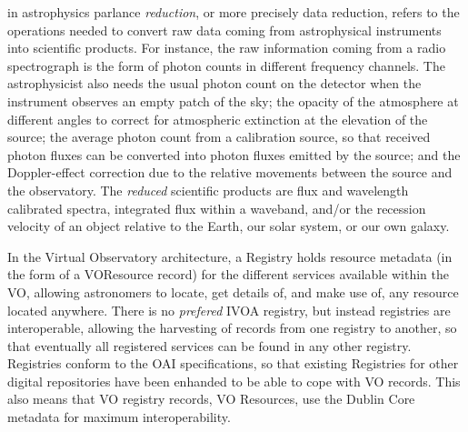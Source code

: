 {
    	in astrophysics parlance \emph{reduction}, or more precisely
        data reduction, refers to the operations needed to convert raw
        data coming from astrophysical instruments into scientific
        products. For instance, the raw information coming from a radio
        spectrograph is the form of photon counts in different
        frequency channels. The astrophysicist also needs the usual
        photon count on the detector when the instrument observes an
        empty patch of the sky; the opacity of the atmosphere at
        different angles to correct for atmospheric extinction at the
        elevation of the source; the average photon count from a
        calibration source, so that received photon fluxes can be
        converted into photon fluxes emitted by the source; and the
        Doppler-effect correction due to the relative movements between
        the source and the observatory. The \emph{reduced} scientific
        products are flux and wavelength calibrated spectra, integrated
        flux within a waveband, and/or the recession velocity of an
        object relative to the Earth, our solar system, or our own
        galaxy.
}

{
    	In the \gls{Virtual Observatory} architecture, a Registry holds
        resource \gls{metadata} (in the form of a \gls{VOResource}
        record) for the different services available within the VO,
        allowing astronomers to locate, get details of, and make use
        of, any resource located anywhere. There is no \emph{prefered}
        IVOA registry, but instead registries are interoperable,
        allowing the \gls{harvesting} of records from one registry to
        another, so that eventually all registered services can be
        found in any other registry. Registries conform to the
        \gls{OAI} specifications, so that existing Registries for other
        digital repositories have been enhanded to be able to cope with
        VO records. This also means that VO registry records, VO
        Resources, use the \gls{Dublin Core} metadata for maximum
        interoperability.
}
 
